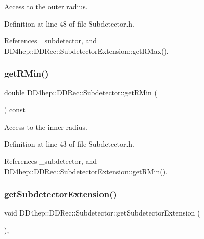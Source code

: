 Access to the outer radius. 



Definition at line 48 of file Subdetector.\+h.



References \+\_\+subdetector, and D\+D4hep\+::\+D\+D\+Rec\+::\+Subdetector\+Extension\+::get\+R\+Max().

\hypertarget{class_d_d4hep_1_1_d_d_rec_1_1_subdetector_ae68b5a1b360a953b02ada83d0dedb526}{}\label{class_d_d4hep_1_1_d_d_rec_1_1_subdetector_ae68b5a1b360a953b02ada83d0dedb526} 
\subsubsection{\texorpdfstring{get\+R\+Min()}{getRMin()}}
{\footnotesize\ttfamily double D\+D4hep\+::\+D\+D\+Rec\+::\+Subdetector\+::get\+R\+Min (\begin{DoxyParamCaption}{ }\end{DoxyParamCaption}) const\hspace{0.3cm}{\ttfamily [inline]}}



Access to the inner radius. 



Definition at line 43 of file Subdetector.\+h.



References \+\_\+subdetector, and D\+D4hep\+::\+D\+D\+Rec\+::\+Subdetector\+Extension\+::get\+R\+Min().

\hypertarget{class_d_d4hep_1_1_d_d_rec_1_1_subdetector_a40f367c23928392476ad5c3f98da8a1a}{}\label{class_d_d4hep_1_1_d_d_rec_1_1_subdetector_a40f367c23928392476ad5c3f98da8a1a} 
\subsubsection{\texorpdfstring{get\+Subdetector\+Extension()}{getSubdetectorExtension()}}
{\footnotesize\ttfamily void D\+D4hep\+::\+D\+D\+Rec\+::\+Subdetector\+::get\+Subdetector\+Extension (\begin{DoxyParamCaption}{ }\end{DoxyParamCaption})\hspace{0.3cm}{\ttfamily [inline]}, {\ttfamily [private]}}



